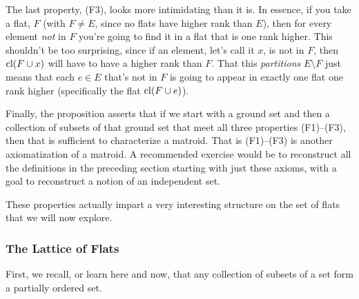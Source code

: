 \documentclass[12pt,oneside]{../../sfsuthesis}
\begin{document}


The last property, (F3), looks more intimidating than it is.
In essence, if you take a flat, \( F \) (with \( F \neq E \), since no flats have higher rank than \( E \)), then for every element \emph{not} in \( F \) you're going to find it in a flat that is one rank higher.
This shouldn't be too surprising, since if an element, let's call it \( x \), is not in \( F \), then \( \operatorname{cl}(F \cup x) \) will have to have a higher rank than \( F \).
That this \emph{partitions} \( E \setminus F \) just means that each \( e \in E \) that's not in \( F \) is going to appear in exactly one flat one rank higher (specifically the flat \( \operatorname{cl}(F \cup e) \)).

Finally, the proposition asserts that if we start with a ground set and then a collection of subsets of that ground set that meet all three properties (F1)--(F3), then that is sufficient to characterize a matroid.
That is (F1)--(F3) is another axiomatization of a matroid.
A recommended exercise would be to reconstruct all the definitions in the preceding section starting with just these axioms, with a goal to reconstruct a notion of an independent set.

These properties actually impart a very interesting structure on the set of flats that we will now explore.

\subsubsection{The Lattice of Flats}

First, we recall, or learn here and now, that any collection of subsets of a set form a partially ordered set.
\end{document}
